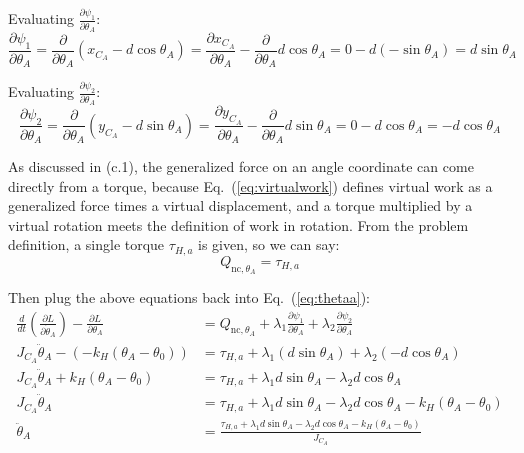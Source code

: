 \documentclass[titlepage]{article}
\begin{document}
Evaluating $\frac{\partial\psi_1}{\partial\theta_A}$:
\begin{equation}
	\frac{\partial\psi_1}{\partial\theta_A}=\frac{\partial}{\partial\theta_A}\left(x_{C_A}-d\cos\theta_A\right)=\frac{\partial x_{C_A}}{\partial\theta_A}-\frac{\partial}{\partial\theta_A}d\cos\theta_A=0-d(-\sin\theta_A)=d\sin\theta_A
\end{equation}

Evaluating $\frac{\partial\psi_2}{\partial\theta_A}$:
\begin{equation}
	\frac{\partial\psi_2}{\partial\theta_A}=\frac{\partial}{\partial\theta_A}\left(y_{C_A}-d\sin\theta_A\right)=\frac{\partial y_{C_A}}{\partial\theta_A}-\frac{\partial}{\partial\theta_A}d\sin\theta_A=0-d\cos\theta_A=-d\cos\theta_A
\end{equation}

As discussed in (c.1), the generalized force on an angle coordinate can come directly from a torque, because Eq.~(\ref{eq:virtualwork}) defines virtual work as a generalized force times a virtual displacement, and a torque multiplied by a virtual rotation meets the definition of work in rotation. From the problem definition, a single torque $\tau_{H,a}$ is given, so we can say:
\begin{equation}
	Q_{\text{nc},\theta_A}=\tau_{H,a}
\end{equation}

Then plug the above equations back into Eq.~(\ref{eq:thetaa}):
\begin{equation}
	\begin{split}
		\frac{d}{dt}\left(\frac{\partial L}{\partial\dot{\theta}_A}\right)-\frac{\partial L}{\partial\theta_A}&=Q_{\text{nc},\theta_A}+\lambda_1\frac{\partial\psi_1}{\partial\theta_A}+\lambda_2\frac{\partial\psi_2}{\partial\theta_A} \\
		J_{C_A}\ddot{\theta}_A-\left(-k_H\left(\theta_A-\theta_0\right)\right)&=\tau_{H,a}+\lambda_1(d\sin\theta_A)+\lambda_2(-d\cos\theta_A) \\
		J_{C_A}\ddot{\theta}_A+k_H\left(\theta_A-\theta_0\right)&=\tau_{H,a}+\lambda_1d\sin\theta_A-\lambda_2d\cos\theta_A \\
		J_{C_A}\ddot{\theta}_A&=\tau_{H,a}+\lambda_1d\sin\theta_A-\lambda_2d\cos\theta_A-k_H\left(\theta_A-\theta_0\right) \\
				\ddot{\theta}_A&=\frac{\tau_{H,a}+\lambda_1d\sin\theta_A-\lambda_2d\cos\theta_A-k_H\left(\theta_A-\theta_0\right)}{J_{C_A}} \\
	\end{split}
\end{equation}
\end{document}
